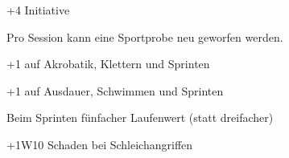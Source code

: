 \documentclass[../../Heldenanleitung2]{subfiles}
\begin{document}
\begin{multicols}{2}

\begin{tcolorbox}[title={Verbesserte Initiative},colbacktitle=green, coltitle=black]    
   +4 Initiative
\end{tcolorbox}

\begin{tcolorbox}[title={Sportlich},colbacktitle=green, coltitle=black]    
   Pro Session kann eine Sportprobe neu geworfen werden.
\end{tcolorbox}

\begin{tcolorbox}[title={Akrobat},colbacktitle=green, coltitle=black]    
   +1 auf Akrobatik, Klettern und Sprinten
\end{tcolorbox}

\begin{tcolorbox}[title={Athlet},colbacktitle=green, coltitle=black]    
   +1 auf Ausdauer, Schwimmen und Sprinten
\end{tcolorbox}


\begin{tcolorbox}[title={Rennen},colbacktitle=green, coltitle=black]    
   Beim Sprinten fünfacher Laufenwert (statt dreifacher)
\end{tcolorbox}


\begin{tcolorbox}[title={Meuchler},colbacktitle=green, coltitle=black]    
   +1W10 Schaden bei Schleichangriffen
\end{tcolorbox}

\end{multicols}
\end{document}
